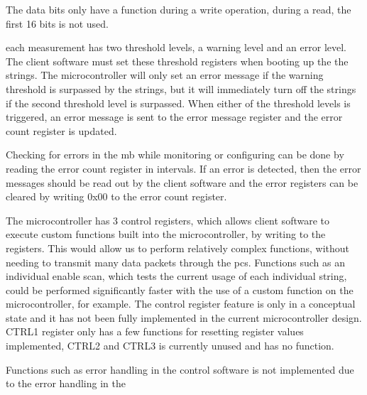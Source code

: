 \documentclass[main.tex]{subfiles}
\begin{document}
The data bits only have a function during a write operation, during a read, the first 16 bits is not used.

each measurement has two threshold levels, a warning level and an error level. The client software must set these threshold registers when booting up the the strings. The microcontroller will only set an error message if the warning threshold is surpassed by the strings, but it will immediately turn off the strings if the second threshold level is surpassed. When either of the threshold levels is triggered, an error message is sent to the error message register and the error count register is updated.

Checking for errors in the \gls{mb} while monitoring or configuring can be done by reading the error count register in intervals. If an error is detected, then the error messages should be read out by the client software and the error registers can be cleared by writing 0x00 to the error count register.

The microcontroller has 3 control registers, which allows client software to execute custom functions built into the microcontroller, by writing to the registers. This would allow us to perform relatively complex functions, without needing to transmit many data packets through the \gls{pcs}. Functions such as an individual enable scan, which tests the current usage of each individual string, could be performed significantly faster with the use of a custom function on the microcontroller, for example. The control register feature is only in a conceptual state and it has not been fully implemented in the current microcontroller design. CTRL1 register only has a few functions for resetting register values implemented, CTRL2 and CTRL3 is currently unused and has no function.

Functions such as error handling in the control software is not implemented due to the error handling in the 




\end{document}
